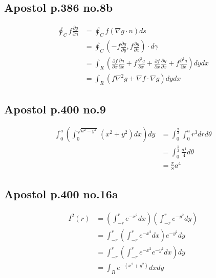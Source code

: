 \documentclass[12pt,letterpaper]{article}
\theoremstyle{definition}
\begin{document}
\subsection*{Apostol p.386 no.8b}

\begin{align*}
  \oint_C f\frac{\partial g}{\partial n} &= \oint_C f(\nabla g \cdot n)ds \\
                                         &= \oint_C \left( -f\frac{\partial g}{\partial y}, f\frac{\partial g}{\partial x} \right)\cdot d\gamma \\
                                         &= \int_R \left( \frac{\partial f}{\partial x}\frac{\partial g}{\partial x} + f\frac{\partial^2 g}{\partial x} + \frac{\partial f}{\partial x}\frac{\partial g}{\partial x} + f\frac{\partial^2 g}{\partial x} \right)dydx \\
                                         &= \int_R \left( f\nabla^2 g + \nabla f \cdot \nabla g \right) dydx
\end{align*}

\subsection*{Apostol p.400 no.9}

\begin{align*}
  \int_0^a\left(\int_0^{\sqrt{a^2-y^2}} (x^2+y^2)dx\right)dy &= \int_{0}^{\frac{\pi}{2}}\int_0^ar^3drd\theta \\
                                                              &= \int_{0}^{\frac{\pi}{2}}\frac{a^4}{4}d\theta \\
                                                              &= \frac{\pi}{8}a^4
\end{align*}

\subsection*{Apostol p.400 no.16a}

\begin{align*}
  I^2(r) &= \left(\int_{-r}^re^{-x^2}dx\right)\left( \int_{-r}^re^{-y^2}dy \right) \\
         &= \int_{-r}^r\left( \int_{-r}^re^{-x^2}dx\right)e^{-y^2}dy \\
         &= \int_{-r}^r\left( \int_{-r}^r e^{-x^2}e^{-y^2}dx \right)dy \\
         &= \int_R e^{-(x^2+y^2)}dxdy
\end{align*}
\end{document}
